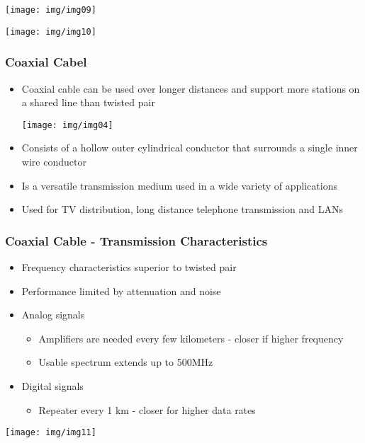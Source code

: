 \documentclass[pdflatex,compress]{beamer}
\begin{document}
\begin{frame}
	\begin{center}
		\texttt{[image: img/img09]}
	\end{center}
\end{frame}

\begin{frame}
	\begin{center}
		\texttt{[image: img/img10]}
	\end{center}
\end{frame}

\begin{frame}
	\frametitle{Coaxial Cabel}
	\begin{itemize}
		\item Coaxial cable can be used over longer distances and support more stations on a shared line than twisted pair
		\begin{center}
			\texttt{[image: img/img04]}
		\end{center}
		\item Consists of a hollow outer cylindrical conductor that surrounds a single inner wire conductor
		\item Is a versatile transmission medium used in a wide variety of applications
		\item Used for TV distribution, long distance telephone transmission and LANs
	\end{itemize}
\end{frame}

\begin{frame}
	\frametitle{Coaxial Cable - Transmission Characteristics}
	\begin{itemize}
		\item Frequency characteristics superior to twisted pair
		\item Performance limited by attenuation and noise
		\item Analog signals
		\begin{itemize}
			\item  Amplifiers are needed every few kilometers - closer if higher frequency
			\item Usable spectrum extends up to 500MHz
		\end{itemize}
		\item Digital signals
		\begin{itemize}
			\item Repeater every 1 km - closer for higher data rates
		\end{itemize}
	\end{itemize}
	\begin{center}
		\texttt{[image: img/img11]}
	\end{center}
\end{frame}
\end{document}
